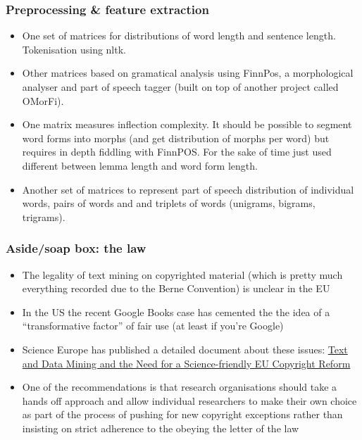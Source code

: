 \documentclass{beamer}
\begin{document}
\begin{frame}
  \frametitle{Preprocessing \& feature extraction}
  \begin{itemize}
    \item One set of matrices for distributions of word length and sentence
      length. Tokenisation using nltk.\pause{}

    \item Other matrices based on gramatical analysis using FinnPos, a
      morphological analyser and part of speech tagger (built on top of another
      project called OMorFi).\pause{}

    \item One matrix measures inflection complexity. It should be possible to
      segment word forms into morphs (and get distribution of morphs per word)
      but requires in depth fiddling with FinnPOS. For the sake of time just
      used different between lemma length and word form length.\pause{}

    \item Another set of matrices to represent part of speech distribution of
      individual words, pairs of words and and triplets of words (unigrams,
      bigrams, trigrams).
  \end{itemize}
\end{frame}

\begin{frame}
  \frametitle{Aside/soap box: the law}
  \begin{itemize}
    \item The legality of text mining on copyrighted material (which is pretty
      much everything recorded due to the Berne Convention) is unclear in the
      EU\pause{}

    \item In the US the recent Google Books case has cemented the the idea of a
      ``transformative factor'' of fair use (at least if you're Google)\pause{}

    \item Science Europe has published a detailed document about these issues:
      \href{http://www.scienceeurope.org/uploads/PublicDocumentsAndSpeeches/WGs_docs/SE_Briefing_Paper_textand_Data_web.pdf}%
      {Text and Data Mining and the Need for a Science-friendly EU Copyright Reform}\pause{}

    \item One of the recommendations is that research organisations should take a
      hands off approach and allow individual researchers to make their own
      choice as part of the process of pushing for new copyright exceptions
      rather than insisting on strict adherence to the obeying the letter of the
      law
  \end{itemize}
\end{frame}
\end{document}
